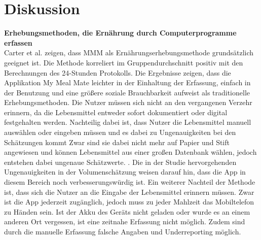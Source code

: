 \newpage
\section{Diskussion}

\textbf{Erhebungsmethoden, die Ernährung durch Computerprogramme erfassen}\\
Carter et al. zeigen, dass MMM als Ernährungserhebungsmethode grundsätzlich geeignet ist. Die Methode korreliert im Gruppendurchschnitt positiv mit den Berechnungen des 24-Stunden Protokolls. Die Ergebnisse zeigen, dass die Applikation My Meal Mate leichter in der Einhaltung der Erfassung, einfach in der Benutzung und eine größere soziale Brauchbarkeit aufweist als traditionelle Erhebungsmethoden. Die Nutzer müssen sich nicht an den vergangenen Verzehr erinnern, da die Lebensmittel entweder sofort dokumentiert oder digital festgehalten werden. Nachteilig dabei ist, dass Nutzer die Lebensmittel manuell auswählen oder eingeben müssen und es dabei zu Ungenauigkeiten bei den Schätzungen kommt Zwar sind sie dabei nicht mehr auf Papier und Stift angewiesen und können Lebensmittel aus einer großen Datenbank wählen, jedoch entstehen dabei ungenaue Schätzwerte. . Die in der Studie hervorgehenden Ungenauigkeiten in der  Volumenschätzung weisen darauf hin, dass die App in diesem Bereich noch verbesserungswürdig ist. Ein weiterer Nachteil der Methode ist, dass sich die Nutzer an die Eingabe der Lebensmittel erinnern müssen. Zwar ist die App jederzeit zugänglich, jedoch muss zu jeder Mahlzeit das Mobiltelefon zu Händen sein. Ist der Akku des Geräts nicht geladen oder wurde es an einem anderen Ort vergessen, ist eine zeitnahe Erfassung nicht möglich. Zudem sind durch die manuelle Erfassung falsche Angaben und Underreporting möglich. \\
